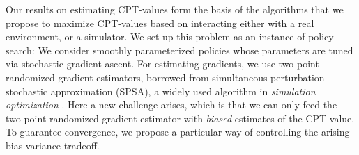 Our results on estimating CPT-values form the basis of the algorithms that we propose to maximize CPT-values based on interacting either with a real environment, or a simulator. We set up this problem as an instance of policy search: We consider smoothly parameterized policies whose parameters are tuned via stochastic gradient ascent. For estimating gradients, we use two-point randomized gradient estimators, borrowed from simultaneous perturbation stochastic approximation (SPSA), a widely used algorithm in \textit{simulation optimization} \cite{fu2015handbook}.
Here a new challenge arises, which is that we can only feed the two-point randomized gradient estimator with \emph{biased} estimates of the CPT-value. To guarantee convergence, we propose a particular way of controlling the arising bias-variance tradeoff.
%
%

